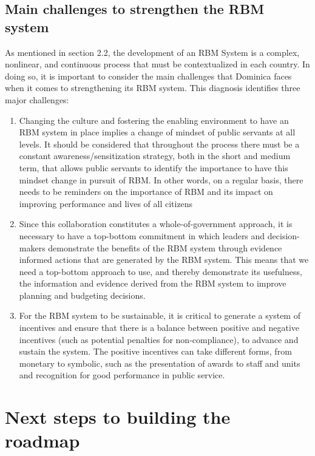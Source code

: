 \documentclass[
]{book}
\begin{document}
\hypertarget{main-challenges-to-strengthen-the-rbm-system}{%
\section{Main challenges to strengthen the RBM system}\label{main-challenges-to-strengthen-the-rbm-system}}

As mentioned in section 2.2, the development of an RBM System is a complex, nonlinear, and continuous process that must be contextualized in each country. In doing so, it is important to consider the main challenges that Dominica faces when it comes to strengthening its RBM system. This diagnosis identifies three major challenges:

\begin{enumerate}
\def\labelenumi{\arabic{enumi}.}
\item
  Changing the culture and fostering the enabling environment to have an RBM system in place implies a change of mindset of public servants at all levels. It should be considered that throughout the process there must be a constant awareness/sensitization strategy, both in the short and medium term, that allows public servants to identify the importance to have this mindset change in pursuit of RBM. In other words, on a regular basis, there needs to be reminders on the importance of RBM and its impact on improving performance and lives of all citizens
\item
  Since this collaboration constitutes a whole-of-government approach, it is necessary to have a top-bottom commitment in which leaders and decision-makers demonstrate the benefits of the RBM system through evidence informed actions that are generated by the RBM system. This means that we need a top-bottom approach to use, and thereby demonstrate its usefulness, the information and evidence derived from the RBM system to improve planning and budgeting decisions.
\item
  For the RBM system to be sustainable, it is critical to generate a system of incentives and ensure that there is a balance between positive and negative incentives (such as potential penalties for non-compliance), to advance and sustain the system. The positive incentives can take different forms, from monetary to symbolic, such as the presentation of awards to staff and units and recognition for good performance in public service.
\end{enumerate}

\hypertarget{section6}{%
\chapter{Next steps to building the roadmap}\label{section6}}
\end{document}
